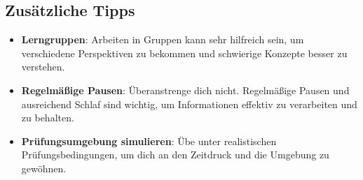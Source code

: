 \documentclass[a4paper,12pt]{article}
\begin{document}
\subsection{Zusätzliche Tipps}
\begin{itemize}
    \item \textbf{Lerngruppen}: Arbeiten in Gruppen kann sehr hilfreich sein, um verschiedene Perspektiven zu bekommen und schwierige Konzepte besser zu verstehen.
    \item \textbf{Regelmäßige Pausen}: Überanstrenge dich nicht. Regelmäßige Pausen und ausreichend Schlaf sind wichtig, um Informationen effektiv zu verarbeiten und zu behalten.
    \item \textbf{Prüfungsumgebung simulieren}: Übe unter realistischen Prüfungsbedingungen, um dich an den Zeitdruck und die Umgebung zu gewöhnen.
\end{itemize}
\end{document}

